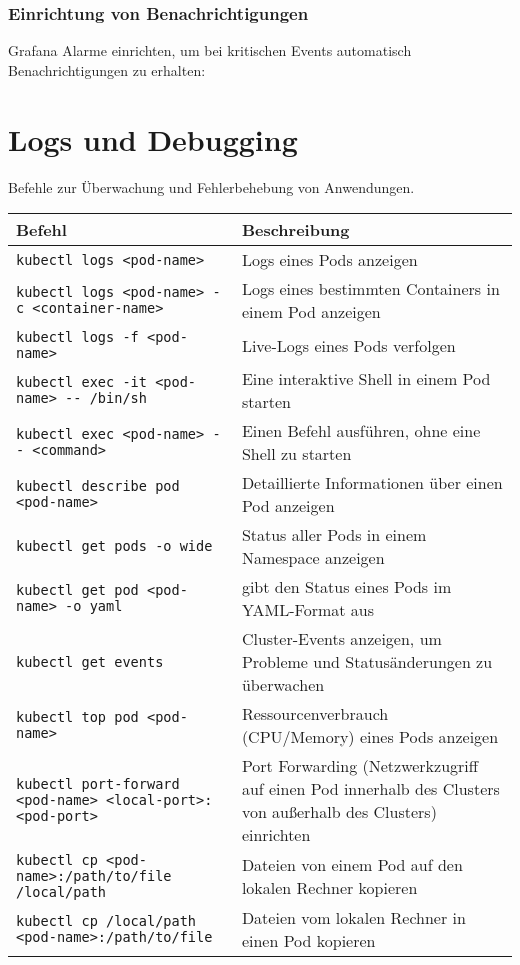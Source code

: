 \subsubsection{Einrichtung von Benachrichtigungen}
Grafana Alarme einrichten, um bei kritischen Events automatisch Benachrichtigungen zu erhalten:


\newpage

\section{Logs und Debugging}
Befehle zur Überwachung und Fehlerbehebung von Anwendungen.\\

\noindent
\begin{tabular}{|p{}|p{}|}
\hline
\textbf{Befehl} & \textbf{Beschreibung} \\
\hline
\texttt{kubectl logs <pod-name>} & Logs eines Pods anzeigen \\
\texttt{kubectl logs <pod-name> -c <container-name>} & Logs eines bestimmten Containers in einem Pod anzeigen \\
\texttt{kubectl logs -f <pod-name>} & Live-Logs eines Pods verfolgen \\
\texttt{kubectl exec -it <pod-name> {-}{-} /bin/sh} & Eine interaktive Shell in einem Pod starten \\
\texttt{kubectl exec <pod-name> {-}{-} <command>} & Einen Befehl ausführen, ohne eine Shell zu starten \\
\texttt{kubectl describe pod <pod-name>} & Detaillierte Informationen über einen Pod anzeigen \\
\texttt{kubectl get pods -o wide} & Status aller Pods in einem Namespace anzeigen\\
\texttt{kubectl get pod <pod-name> -o yaml} & gibt den Status eines Pods im YAML-Format aus\\
\texttt{kubectl get events} & Cluster-Events anzeigen, um Probleme und Statusänderungen zu überwachen \\
\texttt{kubectl top pod <pod-name>} & Ressourcenverbrauch (CPU/Memory) eines Pods anzeigen \\
\texttt{kubectl port-forward <pod-name> <local-port>:<pod-port>} & Port Forwarding (Netzwerkzugriff auf einen Pod innerhalb des Clusters von außerhalb des Clusters) einrichten\\
\texttt{kubectl cp <pod-name>:/path/to/file /local/path} & Dateien von einem Pod auf den lokalen Rechner kopieren\\
\texttt{kubectl cp /local/path <pod-name>:/path/to/file} & Dateien vom lokalen Rechner in einen Pod kopieren\\
\hline
\end{tabular}

